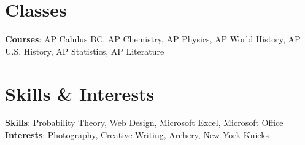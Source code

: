 \documentclass[letterpaper,11pt]{article}
\begin{document}

\section{Classes}
 \begin{itemize}[leftmargin=0.15in, label={}]
    \small{\item{
    \vspace{1mm}
     \textbf{Courses}{: AP Calulus BC, AP Chemistry, AP Physics, AP World History, AP U.S. History, AP Statistics, AP Literature} \\

    }}
 \end{itemize}

\section{Skills \& Interests}
 \begin{itemize}[leftmargin=0.15in, label={}]
    \small{\item{
    \vspace{1mm}
     \textbf{Skills}{: Probability Theory, Web Design, Microsoft Excel, Microsoft Office} \\
     \vspace{1mm}
     \textbf{Interests}{: Photography, Creative Writing, Archery, New York Knicks} \\
     \vspace{1mm}

    }}
 \end{itemize}
\end{document}

